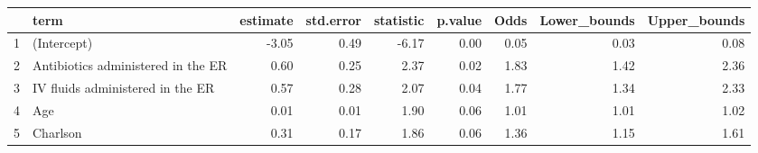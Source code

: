 \documentclass{article}
\begin{document}

\begin{table}[ht]
\centering
\begin{tabular}{rlrrrrrrr}
  \hline
 & term & estimate & std.error & statistic & p.value & Odds & Lower\_bounds & Upper\_bounds \\ 
  \hline
1 & (Intercept) & -3.05 & 0.49 & -6.17 & 0.00 & 0.05 & 0.03 & 0.08 \\ 
  2 & Antibiotics administered in the ER & 0.60 & 0.25 & 2.37 & 0.02 & 1.83 & 1.42 & 2.36 \\ 
  3 & IV fluids administered in the ER & 0.57 & 0.28 & 2.07 & 0.04 & 1.77 & 1.34 & 2.33 \\ 
  4 & Age & 0.01 & 0.01 & 1.90 & 0.06 & 1.01 & 1.01 & 1.02 \\ 
  5 & Charlson & 0.31 & 0.17 & 1.86 & 0.06 & 1.36 & 1.15 & 1.61 \\ 
   \hline
\end{tabular}
\end{table}
\end{document}
